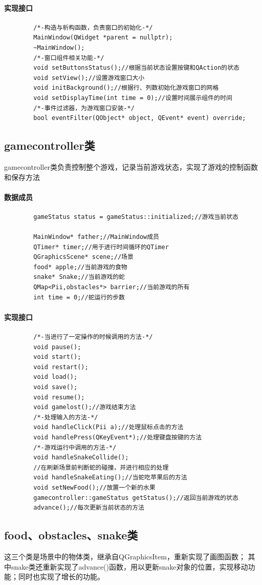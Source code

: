 \documentclass[utf-8]{ctexart}
\begin{document}
    \paragraph{实现接口}
    \begin{lstlisting}
        /*-构造与析构函数，负责窗口的初始化-*/
        MainWindow(QWidget *parent = nullptr);
        ~MainWindow();
        /*-窗口组件相关功能-*/
        void setButtonsStatus();//根据当前状态设置按键和QAction的状态
        void setView();//设置游戏窗口大小
        void initBackground();//根据行、列数初始化游戏窗口的网格
        void setDisplayTime(int time = 0);//设置时间展示组件的时间
        /*-事件过滤器，为游戏窗口安装-*/
        bool eventFilter(QObject* object, QEvent* event) override;
    \end{lstlisting}
    \subsection{gamecontroller类}
    gamecontroller类负责控制整个游戏，记录当前游戏状态，实现了游戏的控制函数和保存方法
    \paragraph{数据成员}
    \begin{lstlisting}
        gameStatus status = gameStatus::initialized;//游戏当前状态

        MainWindow* father;//MainWindow成员
        QTimer* timer;//用于进行时间循环的QTimer
        QGraphicsScene* scene;//场景
        food* apple;//当前游戏的食物
        snake* Snake;//当前游戏的蛇
        QMap<Pii,obstacles*> barrier;//当前游戏的所有
        int time = 0;//蛇运行的步数
    \end{lstlisting}
    \paragraph{实现接口}
    \begin{lstlisting}
        /*-当进行了一定操作的时候调用的方法-*/
        void pause();
        void start();
        void restart();
        void load();
        void save();
        void resume();
        void gamelost();//游戏结束方法
        /*-处理输入的方法-*/
        void handleClick(Pii a);//处理鼠标点击的方法
        void handlePress(QKeyEvent*);//处理键盘按键的方法
        /*-游戏运行中调用的方法-*/
        void handleSnakeCollide();
        //在刷新场景前判断蛇的碰撞，并进行相应的处理
        void handleSnakeEating();//当蛇吃苹果后的方法
        void setNewFood();//放置一个新的水果
        gamecontroller::gameStatus getStatus();//返回当前游戏的状态
        advance();//每次更新当前状态的方法
    \end{lstlisting}
    \subsection{food、obstacles、snake类}
    这三个类是场景中的物体类，继承自QGraphicsItem，重新实现了画图函数；
    其中snake类还重新实现了advance()函数，用以更新snake对象的位置，实现移动功能；同时也实现了增长的功能。
\end{document}
